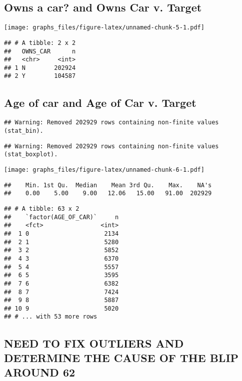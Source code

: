\documentclass[]{article}
\begin{document}
\subsection{Owns a car? and Owns Car v.
Target}\label{owns-a-car-and-owns-car-v.-target}

\texttt{[image: graphs\_files/figure-latex/unnamed-chunk-5-1.pdf]}

\begin{verbatim}
## # A tibble: 2 x 2
##   OWNS_CAR      n
##   <chr>     <int>
## 1 N        202924
## 2 Y        104587
\end{verbatim}

\subsection{Age of car and Age of Car v.
Target}\label{age-of-car-and-age-of-car-v.-target}

\begin{verbatim}
## Warning: Removed 202929 rows containing non-finite values (stat_bin).
\end{verbatim}

\begin{verbatim}
## Warning: Removed 202929 rows containing non-finite values (stat_boxplot).
\end{verbatim}

\texttt{[image: graphs\_files/figure-latex/unnamed-chunk-6-1.pdf]}

\begin{verbatim}
##    Min. 1st Qu.  Median    Mean 3rd Qu.    Max.    NA's 
##    0.00    5.00    9.00   12.06   15.00   91.00  202929
\end{verbatim}

\begin{verbatim}
## # A tibble: 63 x 2
##    `factor(AGE_OF_CAR)`     n
##    <fct>                <int>
##  1 0                     2134
##  2 1                     5280
##  3 2                     5852
##  4 3                     6370
##  5 4                     5557
##  6 5                     3595
##  7 6                     6382
##  8 7                     7424
##  9 8                     5887
## 10 9                     5020
## # ... with 53 more rows
\end{verbatim}

\subsection{NEED TO FIX OUTLIERS AND DETERMINE THE CAUSE OF THE BLIP
AROUND
62}\label{need-to-fix-outliers-and-determine-the-cause-of-the-blip-around-62}
\end{document}
